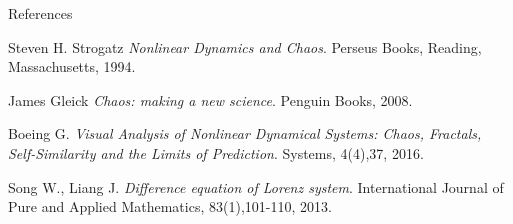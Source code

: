 \documentclass[hyperref={pdfpagelabels=false}]{beamer}
\begin{document}
\begin{frame}{References}
\begin{thebibliography}{9}
Steven H. Strogatz
\textit{Nonlinear Dynamics and Chaos}. 
Perseus Books, Reading, Massachusetts, 1994.

James Gleick
\textit{Chaos: making a new science}. 
Penguin Books, 2008.

Boeing G. 
\textit{Visual Analysis of Nonlinear Dynamical Systems: Chaos, Fractals, Self-Similarity and the Limits of Prediction}. 
Systems, 4(4),37, 2016.

Song W., Liang J. 
\textit{Difference equation of Lorenz system}. 
International Journal of Pure and Applied Mathematics, 83(1),101-110, 2013.


\end{thebibliography}

    
\end{frame}
\end{document}
